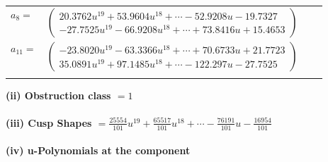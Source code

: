 \documentclass[1p]{elsarticle_modified}
\theoremstyle{definition}
\begin{document}
\begin{tabular}{m{7pt} m{180pt} m{7pt} m{180pt} }
\flushright $a_{8}=$&$\begin{pmatrix}20.3762 u^{19}+53.9604 u^{18}+\cdots-52.9208 u-19.7327\\-27.7525 u^{19}-66.9208 u^{18}+\cdots+73.8416 u+15.4653\end{pmatrix}$ \\
\flushright $a_{11}=$&$\begin{pmatrix}-23.8020 u^{19}-63.3366 u^{18}+\cdots+70.6733 u+21.7723\\35.0891 u^{19}+97.1485 u^{18}+\cdots-122.297 u-27.7525\end{pmatrix}$\\&\end{tabular}
\flushleft \textbf{(ii) Obstruction class $= 1$}\\~\\
\flushleft \textbf{(iii) Cusp Shapes $= \frac{25554}{101} u^{19}+\frac{65517}{101} u^{18}+\cdots-\frac{76191}{101} u-\frac{16954}{101}$}\\~\\
\newpage\renewcommand{\arraystretch}{1}
\flushleft \textbf{(iv) u-Polynomials at the component}\newline \\
\end{document}
